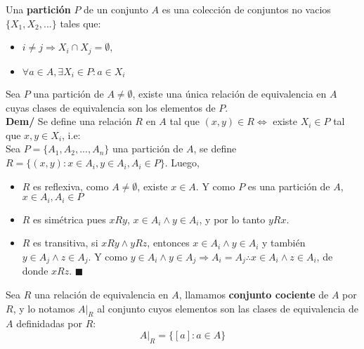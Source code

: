 \documentclass[11pt,a4paper]{article}
\newcommand*{\QEDA}{\null\nobreak\hfill\ensuremath{\blacksquare}}
\begin{document}
\noindent Una \textbf{partici\'on} $P$ de un conjunto $A$ es una colecci\'on de conjuntos no vacios $\{ X_1, X_2, ...\}$ tales que:
\begin{itemize}
\item $i \not = j \Rightarrow X_i \cap X_j = \emptyset$,
\item $\forall a \in A, \exists X_i \in P : a \in X_i$\\
\end{itemize}

\noindent Sea $P$ una partici\'on de $A \not = \emptyset$, existe una \'unica relaci\'on de equivalencia en $A$ cuyas clases de equivalencia son los elementos de $P$.\\
\noindent\textbf{Dem/} Se define una relaci\'on $R$ en $A$ tal que $(x,y) \in R \iff$ existe $X_i \in P$ tal que $x,y \in X_i$, i.e:\\
Sea $P = \{A_1, A_2, ..., A_n\}$ una partici\'on de $A$, se define $R = \{(x,y) : x \in A_i, y \in A_i, A_i \in P\}$. Luego,
\begin{itemize}
\item $R$ es reflexiva, como $A \not = \emptyset$, existe $x \in A$. Y como $P$ es una partici\'on de $A$, $x \in A_i, A_i \in P$
\item $R$ es sim\'etrica pues $xRy$, $x \in A_i \land y \in A_i$, y por lo tanto $yRx$.
\item $R$ es transitiva, si $xRy \land yRz$, entonces $x \in A_i \land y \in A_i$ y tambi\'en $y \in A_j \land z \in A_j$. Y como $y \in A_i \land y \in A_j \Rightarrow A_i = A_j \therefore x \in A_i \land z \in A_i$, de donde $xRz$. \QEDA\\
\end{itemize}

\noindent Sea $R$ una relaci\'on de equivalencia en $A$, llamamos \textbf{conjunto cociente} de $A$ por $R$, y lo notamos $A|_R$ al conjunto cuyos elementos son las clases de equivalencia de $A$ definidadas por $R$: $$A|_R = \{ [a] : a \in A \}$$
\end{document}
